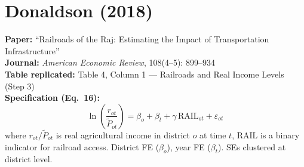\documentclass[11pt,a4paper]{article}
\begin{document}
\newpage

\section{Donaldson (2018)}

\textbf{Paper:} ``Railroads of the Raj: Estimating the Impact of Transportation Infrastructure''\\
\textbf{Journal:} \textit{American Economic Review}, 108(4--5): 899--934\\
\textbf{Table replicated:} Table 4, Column 1 --- Railroads and Real Income Levels (Step 3)\\
\textbf{Specification (Eq.\ 16):}
\[
\ln\!\left(\frac{r_{ot}}{\tilde{P}_{ot}}\right) = \beta_o + \beta_t + \gamma\,\text{RAIL}_{ot} + \varepsilon_{ot}
\]
where $r_{ot}/\tilde{P}_{ot}$ is real agricultural income in district $o$ at time $t$, RAIL is a binary indicator for railroad access. District FE ($\beta_o$), year FE ($\beta_t$). SEs clustered at district level.

\vspace{0.3cm}
\noindent{}
\end{document}
